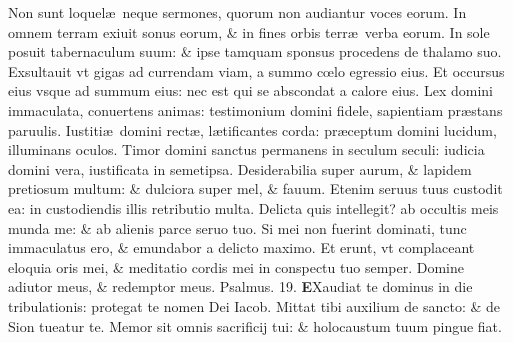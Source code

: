 \documentclass[a5paper,10pt]{book}
\def\ae{æ}
\def\oe{œ}
\begin{document}
\begin{multicols*}{2}
\newline \color{red} N\color{black}on sunt loquel\ae \ neque sermones, quorum non audiantur voces eorum.
\newline \color{red} I\color{black}n omnem terram exiuit sonus eorum, \& in fines orbis terr\ae \ verba eorum.
\newline \color{red} I\color{black}n sole posuit tabernaculum suum: \& ipse tamquam sponsus procedens de thalamo suo.
\newline \color{red} E\color{black}xsultauit vt gigas ad currendam viam, a summo c\oe lo egressio eius.
\newline \color{red} E\color{black}t occursus eius vsque ad summum eius: nec est qui se abscondat a calore eius.
\newline \color{red} L\color{black}ex domini immaculata, conuertens animas: testimonium domini fidele, sapientiam pr\ae stans paruulis.
\newline \color{red} I\color{black}ustiti\ae \ domini rect\ae , l\ae tificantes corda: pr\ae ceptum domini lucidum, illuminans oculos.
\newline \color{red} T\color{black}imor domini sanctus permanens in seculum seculi: iudicia domini vera, iustificata in semetipsa.
\newline \color{red} D\color{black}esiderabilia super aurum, \& lapidem pretiosum multum: \& dulciora super mel, \& fauum.
\newline \color{red} E\color{black}tenim seruus tuus custodit ea: in custodiendis illis retributio multa.
\newline \color{red} D\color{black}elicta quis intellegit? ab occultis meis munda me: \& ab alienis parce seruo tuo.
\newline \color{red} S\color{black}i mei non fuerint dominati, tunc immaculatus ero, \& emundabor a delicto maximo.
\newline \color{red} E\color{black}t erunt, vt complaceant eloquia oris mei, \& meditatio cordis mei in conspectu tuo semper.
\newline \color{red} D\color{black}omine adiutor meus, \& redemptor meus. \quad \color{red} Psalmus. \hypertarget{ps19}{19.} \color{black}
\vspace{-1em}
\lettrine[lines=2]{\bfseries \color{red} E}{}Xaudiat te dominus in die tribulationis: protegat te nomen Dei Iacob.
\newline \color{red} M\color{black}ittat tibi auxilium de sancto: \& de Sion tueatur te.
\newline \color{red} M\color{black}emor sit omnis sacrificij tui: \& holocaustum tuum pingue fiat.

\end{multicols*}
\end{document}
